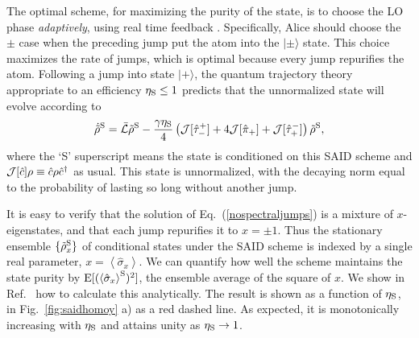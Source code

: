 \documentclass[12pt,prl,floatfix,showpacs,superscriptaddress,amsmath,amssymb]{revtex4}
\newcommand{\beq}{\begin{equation}}
\newcommand{\eeq}{\end{equation}}
\newcommand{\erf}[1]{Eq.~(\ref{#1})}
\newcommand{\dg}{^\dagger}
\newcommand{\ket}[1]{|{#1}\rangle}
\newcommand{\op}[2]{\hat \tau_{#1}^{#2}}
\renewcommand{\(}{\left(}
\renewcommand{\)}{\right)}
\newcommand{\ro}[1]{\left( {#1} \right)}
\newcommand{\an}[1]{\left\langle{#1}\right\rangle}
\newcommand{\p}{^{\rm S}}
\newcommand{\s}[1]{\hat \sigma_{#1}}
\begin{document}
The optimal scheme, for maximizing the purity of the state, is to choose the LO phase {\em adaptively}, using real time feedback \cite{WisMil10}. Specifically, Alice should choose the $\pm$ case when the preceding  jump put the atom into the $\ket{\pm}$ state. This choice maximizes the rate of jumps, which is optimal because every jump repurifies the atom. 
Following a jump into state $\ket{+}$, the quantum trajectory theory appropriate to an efficiency $\eta_{\rm S}\leq 1$ \cite{WisMil10} predicts that the unnormalized state will evolve according to 
\beq \label{nospectraljumps}
\dot{\tilde\rho}\p  =  \bar{\cal L}\tilde \rho\p - \frac{\gamma\eta_{\rm S}}{4}
\ro{{\cal J}[\op-+] +    4{\cal J}[\hat\pi_+] + {\cal J}[\op+-]} \tilde\rho\p,
\eeq
where the `S' superscript means the state is conditioned on this SAID scheme and  ${\cal J}[\hat c]\rho \equiv \hat c\rho \hat c\dg$ as usual. This state is unnormalized, with 
the decaying norm equal to the probability of lasting so long without another jump. 

It is easy to verify that the solution of \erf{nospectraljumps} is a mixture of $x$-eigenstates, and that each 
jump repurifies it to $x=\pm 1$. Thus the stationary ensemble $\{\tilde\rho\p_x\}$ of conditional states under the SAID scheme %
is indexed by a single real parameter, $x=\an{\s{x}}$. We can quantify how well the scheme maintains the state purity by ${\rm E}[(\an{\s{x}}\p)^2]$, the ensemble average of the square of $x$. We show in Ref.~\cite{epaps} how to  
calculate this analytically. 
The result is shown as a function of $\eta_{\rm S}$, in Fig.~\ref{fig:saidhomoy} a) as a red dashed line. As expected, it is monotonically increasing with $\eta_{\rm S}$ and attains unity as $\eta_{\rm S}\to 1$.
 
\end{document}
